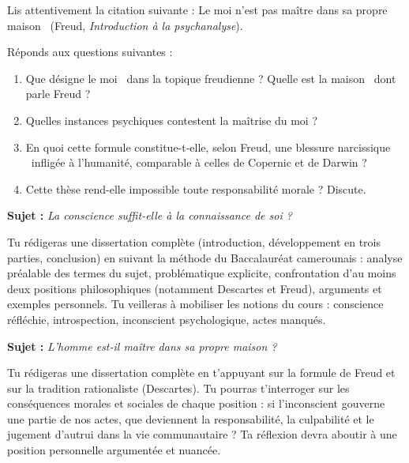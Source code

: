 \documentclass[11pt]{article}
\newcounter{popsec}
\newcounter{popsub}
\newcommand{\courssub}[1]{%
  \stepcounter{popsub}%
  \par\vspace{9pt}\noindent{\popxbold\fontsize{11.5}{13}\selectfont\color{popink}{\color{poporange}\thepopsec.\thepopsub}\hspace{6pt}#1}\par\nopagebreak\vspace{4pt}
}
\begin{document}
\begin{exercice}
Lis attentivement la citation suivante : \guillemotleft Le moi n'est pas maître dans sa propre maison \guillemotright\ (Freud, \emph{Introduction à la psychanalyse}).

Réponds aux questions suivantes :
\begin{enumerate}
\item Que désigne le \guillemotleft moi \guillemotright\ dans la topique freudienne ? Quelle est la \guillemotleft maison \guillemotright\ dont parle Freud ?
\item Quelles instances psychiques contestent la maîtrise du moi ?
\item En quoi cette formule constitue-t-elle, selon Freud, une \guillemotleft blessure narcissique \guillemotright\ infligée à l'humanité, comparable à celles de Copernic et de Darwin ?
\item Cette thèse rend-elle impossible toute responsabilité morale ? Discute.
\end{enumerate}
\end{exercice}

\courssub{Je me prépare au Bac}

\begin{exercice}
\textbf{Sujet :} \emph{La conscience suffit-elle à la connaissance de soi ?}

Tu rédigeras une dissertation complète (introduction, développement en trois parties, conclusion) en suivant la méthode du Baccalauréat camerounais : analyse préalable des termes du sujet, problématique explicite, confrontation d'au moins deux positions philosophiques (notamment Descartes et Freud), arguments et exemples personnels. Tu veilleras à mobiliser les notions du cours : conscience réfléchie, introspection, inconscient psychologique, actes manqués.
\end{exercice}

\begin{exercice}
\textbf{Sujet :} \emph{L'homme est-il maître dans sa propre maison ?}

Tu rédigeras une dissertation complète en t'appuyant sur la formule de Freud et sur la tradition rationaliste (Descartes). Tu pourras t'interroger sur les conséquences morales et sociales de chaque position : si l'inconscient gouverne une partie de nos actes, que deviennent la responsabilité, la culpabilité et le jugement d'autrui dans la vie communautaire ? Ta réflexion devra aboutir à une position personnelle argumentée et nuancée.
\end{exercice}
\end{document}
